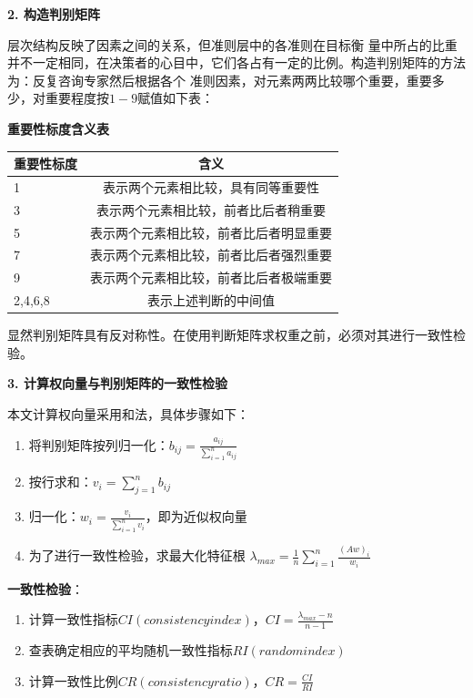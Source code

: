 \documentclass[openany,oneside]{ctexbook}
\begin{document}
{\bfseries 2. 构造判别矩阵}

层次结构反映了因素之间的关系，但准则层中的各准则在目标衡
量中所占的比重
并不一定相同，在决策者的心目中，它们各占有一定的比例。构造判别矩阵的方法为：反复咨询专家然后根据各个
准则因素，对元素两两比较哪个重要，重要多少，对重要程度按$1-9$赋值如下表：

\begin{center}
   \textbf{重要性标度含义表}
\end{center}

\begin{table}[!htp]
   \centering
   \begin{tabular}{l|c}
      \hline
      重要性标度&含义 \\ \hline
      1&表示两个元素相比较，具有同等重要性 \\ \hline
      3&表示两个元素相比较，前者比后者稍重要 \\ \hline
      5&表示两个元素相比较，前者比后者明显重要 \\\hline
      7&表示两个元素相比较，前者比后者强烈重要 \\\hline
      9&表示两个元素相比较，前者比后者极端重要 \\\hline
      2,4,6,8&表示上述判断的中间值 \\\hline
      
   \end{tabular}
\end{table}


显然判别矩阵具有反对称性。在使用判断矩阵求权重之前，必须对其进行一致性检验。

{\bfseries 3. 计算权向量与判别矩阵的一致性检验}


本文计算权向量采用和法，具体步骤如下：
\begin{enumerate}
   \item 将判别矩阵按列归一化：$b_{ij}=\displaystyle\frac{a_{ij}}{\displaystyle\sum_{i=1}^{n}a_{ij}}$
   \item 按行求和：$v_i=\displaystyle\sum_{j=1}^{n}b_{ij}$
   \item 归一化：$w_i=\displaystyle\frac{v_i}{\displaystyle\sum_{i=1}^{n}v_i}$，即为近似权向量
   \item 为了进行一致性检验，求最大化特征根 $\lambda_{max}=\displaystyle\frac{1}{n}\displaystyle\sum_{i=1}^{n}\displaystyle\frac{(Aw)_{i}}{w_i}$
\end{enumerate}

{\bfseries 一致性检验}：
\begin{enumerate}
   \item 计算一致性指标$CI(consistency index)$，$CI=\displaystyle\frac{\lambda_{max}-n}{n-1}$
   \item 查表确定相应的平均随机一致性指标$RI(random index)$
   \item 计算一致性比例$CR(consistency ratio)$，$CR=\displaystyle\frac{CI}{RI}$
\end{enumerate}
\end{document}
